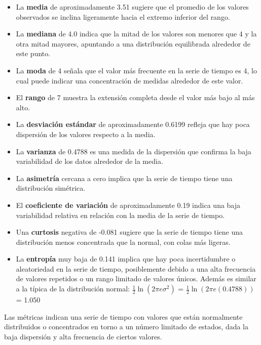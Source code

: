 \documentclass[11pt]{article} %
\begin{document}
	 \begin{itemize}
	 	\item La \textbf{media} de aproximadamente 3.51 sugiere que el promedio de los valores observados se inclina ligeramente hacia el extremo inferior del rango.
	 	\item La \textbf{mediana} de 4.0 indica que la mitad de los valores son menores que 4 y la otra mitad mayores, apuntando a una distribución equilibrada alrededor de este punto.
	 	\item La \textbf{moda} de 4 señala que el valor más frecuente en la serie de tiempo es 4, lo cual puede indicar una concentración de medidas alrededor de este valor.
	 	\item El \textbf{rango} de 7 muestra la extensión completa desde el valor más bajo al más alto.
	 	\item La \textbf{desviación estándar} de aproximadamente 0.6199 refleja que hay poca dispersión de los valores respecto a la media.
	 	\item La \textbf{varianza} de 0.4788 es una medida de la dispersión que confirma la baja variabilidad de los datos alrededor de la media.
	 	\item La \textbf{asimetría} cercana a cero implica que la serie de tiempo tiene una distribución simétrica.
	 	\item El \textbf{coeficiente de variación} de aproximadamente 0.19 indica una baja variabilidad relativa en relación con la media de la serie de tiempo.
	 	\item Una \textbf{curtosis} negativa de -0.081 sugiere que la serie de tiempo tiene una distribución menos concentrada que la normal, con colas más ligeras.
	 	\item La \textbf{entropía} muy baja de 0.141 implica que hay poca incertidumbre o aleatoriedad en la serie de tiempo, posiblemente debido a una alta frecuencia de valores repetidos o un rango limitado de valores únicos. Además es similar a la típica de la distribución normal: \(\frac{1}{2} \ln(2 \pi e \sigma^2)\) = \(\frac{1}{2} \ln(2 \pi e (0.4788))\) = 1.050
	 \end{itemize}
	 
	 Las métricas indican una serie de tiempo con valores que están normalmente distribuidos o concentrados en torno a un número limitado de estados, dada la baja dispersión y alta frecuencia de ciertos valores.
	 
\end{document}
